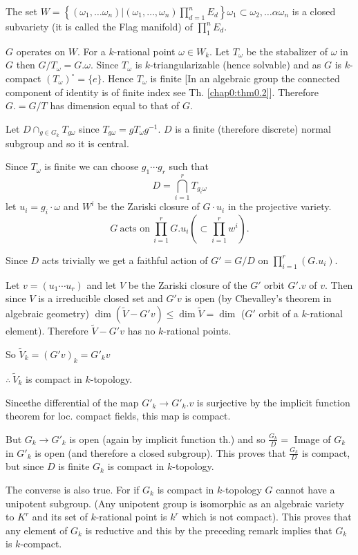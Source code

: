 The set $W = \left\{ (\omega_1, \ldots \omega_n)\Big| (\omega_1, \ldots ,
\omega_n) \displaystyle{\prod^n_{d=1}} E_d \right\} \omega_1 \subset
\omega_2 , \ldots \alpha \omega_n$ is a closed subvariety (it is
called the Flag manifold) of $\displaystyle{\prod^n_{1}}E_d$.

$G$ operates on $W$. For a $k$-rational point $\omega \in
W_k$. Let $T_\omega$ be the stabalizer of $\omega$ in $G$ then
$G/T_\omega=G. \omega$. Since $T_\omega$ is $k$-triangularizable\pageoriginale
(hence solvable) and as $G$ is $k$-compact $(T_\omega)^\circ= \{
e\}$. Hence $T_\omega$ is finite [In an algebraic group the connected
  component of identity is of finite index see Th. \ref{chap0:thm0.2}].
Therefore $G.= G/T$ has dimension equal to that of $G$.

Let $D \displaystyle{\mathop{\cap}_{g \in G_k} T_{g \omega}}$ since
$T_{g \omega}= g T_\omega g^{-1}$. $D$ is a finite (therefore
discrete) normal subgroup and so it is central.

Since $T_\omega$ is finite we can choose $g_1\cdots g_r$ such that
$$
D= \bigcap^r_{i=1} T_{g_i \omega}
$$
let $u_i = g_i \cdot \omega$ and $W^i$ be the Zariski closure of $G
\cdot u_i$ in the projective variety.
$$
G ~\text{acts on}~ \prod^r_{i=1} G. u_i \left(\subset \prod^r_{i=1} w^i \right).
$$

Since $D$ acts trivially we get a faithful action of $G' = G/D$
on $\displaystyle{\prod^r_{i=1}(G. u_i)}$.

Let $v= (u_1 \cdots u_r)$ and let $V$ be the Zariski closure of the
$G'$ orbit $G'. v$ of $v$. Then since $V$ is a irreducible closed set
and $G'v$ is open (by Chevalley's theorem in algebraic geometry) $\dim
(\widetilde{V} - G'v) \leq \dim \widetilde{V}= \dim$ ($G'$ orbit of a
$k$-rational element). Therefore $\widetilde{V}- G'v$ has no
$k$-rational points.

So $\widetilde{V}_k = (G' v)_k= G'_k v$

$\therefore ~ \widetilde{V}_k$ is compact in $k$-topology.

Since\pageoriginale the differential of the map $G'_k \to G'_k. v$ is surjective by
the implicit function theorem for loc. compact fields, this map is
compact.

But $G_k \to G'_k$ is open (again by implicit function th.) and so
$\frac{G_k}{D} =$ Image of $G_k$ in $G'_k$ is open (and therefore a
closed subgroup). This proves that $\frac{G_k}{D}$ is compact, but
since $D$ is finite $G_k$ is compact in $k$-topology.

The converse is also true. For if $G_k$ is compact in $k$-topology $G$
cannot have a unipotent subgroup. (Any unipotent group is isomorphic
as an algebraic variety to $K^r$ and its set of $k$-rational point is
$k^r$ which is not compact). This proves that any element of $G_k$ is
reductive and this by the preceding remark implies that $G_k$ is
$k$-compact. 
